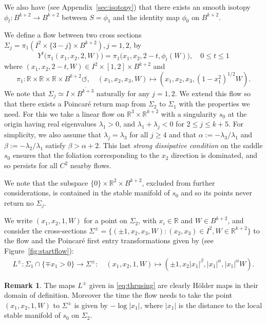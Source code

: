 \documentclass[reqno,12pt,a4paper]{amsart}
\theoremstyle{plain}
\theoremstyle{definition}
\newtheorem{remark}[theorem]{Remark}
\begin{document}
We also have (see Appendix~\ref{sec:isotopy}) that there
exists an smooth isotopy $\phi_t:B^{k+2}\to B^{k+2}$ between
$S=\phi_1$ and the identity map $\phi_0$ on $B^{k+2}$.

We define a flow between two cross sections
$\Sigma_j=\pi_1(I^2\times\{3-j\}\times B^{k+2}), j=1,2$,
by
$$
Y^t\big( \pi_1 (x_1,x_2,2,W)\big)=
\pi_1\big(x_1,x_2,2-t,\phi_t(W)\big),\quad 0\le t\le1
$$
where $(x_1,x_2,2-t,W)\in
I^2\times[1,2]\times B^{k+2}$ and
$$
\pi_1: {{\mathbb R}}\times{{\mathbb R}}\times{{\mathbb R}}\times B^{k+2}\circlearrowleft,
\quad (x_1,x_2,x_3,W)\mapsto(x_1,x_2,x_3,(1-x_1^2)^{1/2}W).
$$
We note that $\Sigma_j\simeq I\times\overline{B^{k+3}}$
naturally for any $j=1,2$.
We extend this flow so that there exists a Poincar\'e return
map from $\Sigma_2$ to $\Sigma_1$ with the properties we
need. For this we take a linear flow on
${{\mathbb R}}^3\times {{\mathbb R}}^{k+2}$ with a singularity $s_0$ at the
origin having real eigenvalues $\lambda_1 >0$, and
$\lambda_1+\lambda_j< 0$ for $2\le j \le k+5$. For
simplicity, we also assume that $\lambda_j=\lambda_3$ for
all $j\ge4$ and that $\alpha:=-\lambda_3/\lambda_1$ and
$\beta:=-\lambda_2/\lambda_1$ satisfy $\beta>\alpha+2$. This
last \emph{strong dissipative condition} on the saddle $s_0$
ensures that the foliation corresponding to the $x_2$
direction is dominated, and so persists for all $C^2$ nearby
flows.

We note that the subspace $\{0\}\times{{\mathbb R}}^2\times B^{k+2}$,
excluded from further considerations, is contained in the stable
manifold of $s_0$ and so its points never return no
$\Sigma_j$.

We write $(x_1,x_2,1,W)$ for a point on $\Sigma_2$, with
$x_i\in{{\mathbb R}}$ and $W\in B^{k+2}$, and consider the
cross-sections $\Sigma^\pm=\{(\pm1,x_2,x_3,W): (x_2,x_3)\in
I^2, W\in{{\mathbb R}}^{k+2}\}$ to the flow and the Poincar\'e first
entry transformations given by (see
Figure~\ref{fig:startflow}):
\begin{align}\label{eq:thrusing}
  L^\pm: \Sigma_1\cap\{\mp x_1>0\}\to \Sigma^\pm: \quad
  (x_1,x_2,1,W)\mapsto (\pm 1, x_2 |x_1|^\beta,
  |x_1|^{\alpha}, |x_1|^{\alpha}W).
\end{align}

\begin{remark}
  \label{rmk:Holder-thru}
  The maps $L^\pm$ given in \eqref{eq:thrusing} are clearly
  H\"older maps in their domain of definition. Moreover the
  time the flow needs to take the point $(x_1,x_2,1,W)$ to
  $\Sigma^\pm$ is given by $-\log |x_1|$, where $|x_1|$ is
  the distance to the local stable manifold of $s_0$ on
  $\Sigma_2$.
\end{remark}
\end{document}

